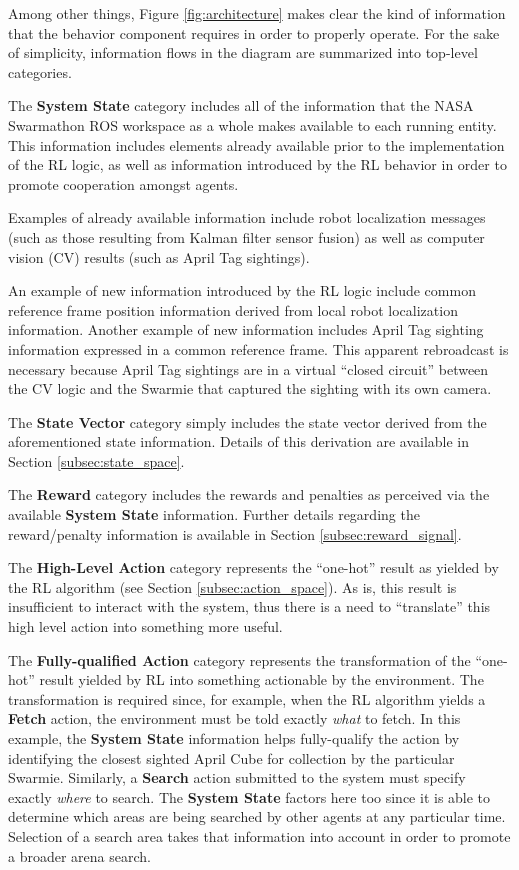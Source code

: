 \documentclass[sigconf,authordraft]{acmart}
\begin{document}
Among other things, Figure \ref{fig:architecture} makes clear the kind of information that the behavior component requires in order to properly operate. For the sake of simplicity, information flows in the diagram are summarized into top-level categories.

The \textbf{System State} category includes all of the information that the NASA Swarmathon ROS workspace as a whole makes available to each running entity. This information includes elements already available prior to the implementation of the RL logic, as well as information introduced by the RL behavior in order to promote cooperation amongst agents.

Examples of already available information include robot localization messages (such as those resulting from Kalman filter sensor fusion) as well as computer vision (CV) results (such as April Tag sightings).

An example of new information introduced by the RL logic include common reference frame position information derived from local robot localization information. Another example of new information includes April Tag sighting information expressed in a common reference frame. This apparent rebroadcast is necessary because April Tag sightings are in a virtual ``closed circuit'' between the CV logic and the Swarmie that captured the sighting with its own camera.

The \textbf{State Vector} category simply includes the state vector derived from the aforementioned state information. Details of this derivation are available in Section \ref{subsec:state_space}.

The \textbf{Reward} category includes the rewards and penalties as perceived via the available \textbf{System State} information. Further details regarding the reward/penalty information is available in Section \ref{subsec:reward_signal}.

The \textbf{High-Level Action} category represents the ``one-hot'' result as yielded by the RL algorithm (see Section \ref{subsec:action_space}). As is, this result is insufficient to interact with the system, thus there is a need to ``translate'' this high level action into something more useful.

The \textbf{Fully-qualified Action} category represents the transformation of the ``one-hot'' result yielded by RL into something actionable by the environment. The transformation is required since, for example, when the RL algorithm yields a \textbf{Fetch} action, the environment must be told exactly \textit{what} to fetch. In this example, the \textbf{System State} information helps fully-qualify the action by identifying the closest sighted April Cube for collection by the particular Swarmie. Similarly, a \textbf{Search} action submitted to the system must specify exactly \textit{where} to search. The
\textbf{System State} factors here too since it is able to determine which areas are being searched by other agents at any particular time. Selection of a search area takes that information into account in order to promote a broader arena search.
\end{document}
